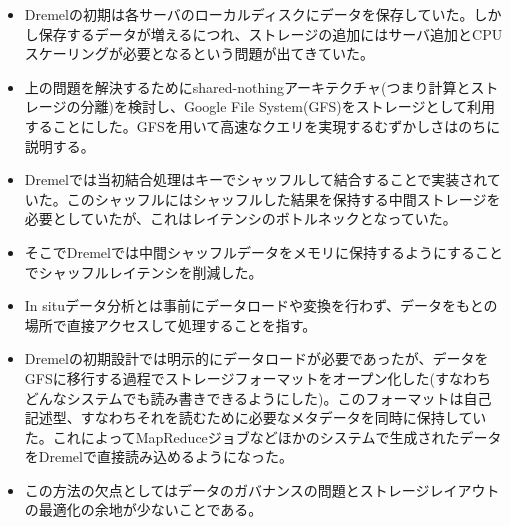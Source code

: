 \documentclass[dvipdfmx,uplatex]{jsarticle}
\theoremstyle{remark}
\newenvironment{method}[1]{
    \begin{tcolorbox}[
        colframe=green!50!black,
        colback=green!50!black!10!white,
        colbacktitle=green!50!black!40!white,
        coltitle=black,
        fonttitle=\bfseries,
        title={#1}
    ]
}{
    \end{tcolorbox}
}
\begin{document}
\begin{method}{計算とストレージの分離}
\begin{itemize}
    \item Dremelの初期は各サーバのローカルディスクにデータを保存していた。しかし保存するデータが増えるにつれ、ストレージの追加にはサーバ追加とCPUスケーリングが必要となるという問題が出てきていた。
    \item 上の問題を解決するためにshared-nothingアーキテクチャ(つまり計算とストレージの分離)を検討し、Google File System(GFS)をストレージとして利用することにした。GFSを用いて高速なクエリを実現するむずかしさはのちに説明する。
    \item Dremelでは当初結合処理はキーでシャッフルして結合することで実装されていた。このシャッフルにはシャッフルした結果を保持する中間ストレージを必要としていたが、これはレイテンシのボトルネックとなっていた。
    \item そこでDremelでは中間シャッフルデータをメモリに保持するようにすることでシャッフルレイテンシを削減した。
\end{itemize}
\end{method}

\begin{method}{In Situデータ分析}
\begin{itemize}
    \item In situデータ分析とは事前にデータロードや変換を行わず、データをもとの場所で直接アクセスして処理することを指す。
    \item Dremelの初期設計では明示的にデータロードが必要であったが、データをGFSに移行する過程でストレージフォーマットをオープン化した(すなわちどんなシステムでも読み書きできるようにした)。このフォーマットは自己記述型、すなわちそれを読むために必要なメタデータを同時に保持していた。これによってMapReduceジョブなどほかのシステムで生成されたデータをDremelで直接読み込めるようになった。
    \item この方法の欠点としてはデータのガバナンスの問題とストレージレイアウトの最適化の余地が少ないことである。
\end{itemize}
\end{method}
\end{document}
